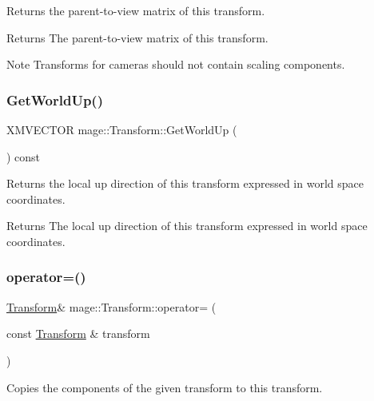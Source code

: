 Returns the parent-\/to-\/view matrix of this transform.

\begin{DoxyReturn}{Returns}
The parent-\/to-\/view matrix of this transform. 
\end{DoxyReturn}
\begin{DoxyNote}{Note}
Transforms for cameras should not contain scaling components. 
\end{DoxyNote}
\hypertarget{structmage_1_1_transform_af28786b745a144eef74d69a55055b00a}{}\label{structmage_1_1_transform_af28786b745a144eef74d69a55055b00a} 
\subsubsection{\texorpdfstring{Get\+World\+Up()}{GetWorldUp()}}
{\footnotesize\ttfamily X\+M\+V\+E\+C\+T\+OR mage\+::\+Transform\+::\+Get\+World\+Up (\begin{DoxyParamCaption}{ }\end{DoxyParamCaption}) const}

Returns the local up direction of this transform expressed in world space coordinates.

\begin{DoxyReturn}{Returns}
The local up direction of this transform expressed in world space coordinates. 
\end{DoxyReturn}
\hypertarget{structmage_1_1_transform_a40bc8c32b09dc419d0573fffcd938644}{}\label{structmage_1_1_transform_a40bc8c32b09dc419d0573fffcd938644} 
\subsubsection{\texorpdfstring{operator=()}{operator=()}\hspace{0.1cm}{\footnotesize\ttfamily [1/2]}}
{\footnotesize\ttfamily \hyperlink{structmage_1_1_transform}{Transform}\& mage\+::\+Transform\+::operator= (\begin{DoxyParamCaption}\item[{const \hyperlink{structmage_1_1_transform}{Transform} \&}]{transform }\end{DoxyParamCaption})}

Copies the components of the given transform to this transform.


